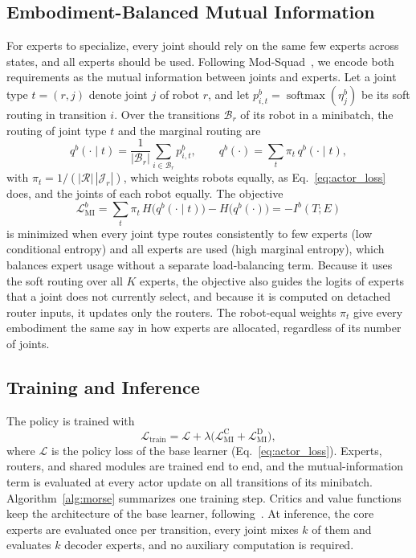 \subsection{Embodiment-Balanced Mutual Information}
\label{sec:mi}

For experts to specialize, every joint should rely on the same few experts across states, and all experts should be
used. Following Mod-Squad~\citep{chen2023modsquad}, we encode both requirements as the mutual information between
joints and experts. Let a joint type $t=(r,j)$ denote joint $j$ of robot $r$, and let $p^{b}_{i,t}=\operatorname{softmax}
(\eta^{b}_j)$ be its soft routing in transition $i$. Over the transitions $\mathcal{B}_r$ of its robot in a minibatch,
the routing of joint type $t$ and the marginal routing are
\begin{equation}
q^{b}(\cdot\mid t)=\frac{1}{|\mathcal{B}_r|}\sum_{i\in\mathcal{B}_r}p^{b}_{i,t},\qquad
q^{b}(\cdot)=\sum_{t}\pi_t\,q^{b}(\cdot\mid t),
\label{eq:routing_marginals}
\end{equation}
with $\pi_t=1/(|\mathcal{R}|\,|\mathcal{J}_r|)$, which weights robots equally, as Eq.~\eqref{eq:actor_loss} does, and
the joints of each robot equally. The objective
\begin{equation}
\mathcal{L}^{b}_{\mathrm{MI}}=\sum_{t}\pi_t\,H\bigl(q^{b}(\cdot\mid t)\bigr)-H\bigl(q^{b}(\cdot)\bigr)
=-I^{b}(T;E)
\label{eq:mi}
\end{equation}
is minimized when every joint type routes consistently to few experts (low conditional entropy) and all experts are
used (high marginal entropy), which balances expert usage without a separate load-balancing term. Because it uses the
soft routing over all $K$ experts, the objective also guides the logits of experts that a joint does not currently
select, and because it is computed on detached router inputs, it updates only the routers. The robot-equal weights
$\pi_t$ give every embodiment the same say in how experts are allocated, regardless of its number of joints.

\subsection{Training and Inference}
\label{sec:training}

The policy is trained with
\begin{equation}
\mathcal{L}_{\mathrm{train}}=\mathcal{L}
+\lambda\bigl(\mathcal{L}^{\mathrm{C}}_{\mathrm{MI}}+\mathcal{L}^{\mathrm{D}}_{\mathrm{MI}}\bigr),
\label{eq:train}
\end{equation}
where $\mathcal{L}$ is the policy loss of the base learner (Eq.~\eqref{eq:actor_loss}). Experts, routers, and shared
modules are trained end to end, and the mutual-information term is evaluated at every actor update on all transitions
of its minibatch. Algorithm~\ref{alg:morse} summarizes one training step. Critics and value functions keep the
architecture of the base learner, following~\citet{abe2026crossembodimentoffline}. At inference, the core experts are
evaluated once per transition, every joint mixes $k$ of them and evaluates $k$ decoder experts, and no auxiliary
computation is required.

